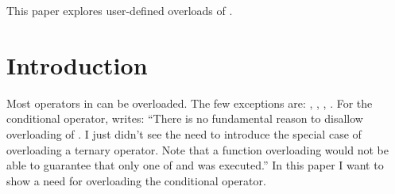 \newcommand\wgTitle{Making operator?: overloadable}
\newcommand\wgName{Matthias Kretz <m.kretz@gsi.de>}
\newcommand\wgDocumentNumber{D0917R4}
\newcommand\wgGroup{EWG-I}
\newcommand\wgTarget{\CC{}23}

\usepackage{mymacros}
\usepackage{wg21}
\usepackage{changelog}
\usepackage{underscore}



\newcommand\simd[1][]{\type{simd#1}\xspace}
\newcommand\simdT{\type{simd<T>}\xspace}
\newcommand\valuetype{\type{value\_type}\xspace}
\newcommand\referencetype{\type{reference}\xspace}
\newcommand\whereexpression{\type{where\_expression}\xspace}
\newcommand\simdcast{\code{simd\_cast}\xspace}
\newcommand\mask[1][]{\type{simd\_mask#1}\xspace}
\newcommand\maskT{\type{simd\_mask<T>}\xspace}
\newcommand\fixedsizeN{\type{simd\_abi::fixed\_size<N>}\xspace}
\newcommand\fixedsizescoped{\type{simd\_abi::fixed\_size}\xspace}
\newcommand\fixedsize{\type{fixed\_size}\xspace}
\newcommand\simdEP{\code{execution::}\type{simd}\xspace}
\newcommand\seqEP{\code{execution::}\type{seq}\xspace}

\newenvironment{tonytable}[1]{
\renewcommand\tablename{Tony Table}
\begin{table}[h]
\caption{#1}
\begin{tabular}{p{.45\textwidth}|p{.45\textwidth}}
before&after\\
\hline
}{
\end{tabular}
\end{table}
\renewcommand\tablename{Table}
}


\begin{wgTitlepage}
  This paper explores user-defined overloads of .
\end{wgTitlepage}

\pagestyle{scrheadings}
\section{Introduction}
Most operators in \CC{} can be overloaded.
The few exceptions are: , \code{::}, , .
For the conditional operator, \textcite{StrFaq} writes:
“There is no fundamental reason to disallow overloading of .
I just didn't see the need to introduce the special case of overloading a ternary operator.
Note that a function overloading  would not be able to guarantee that only one of  and  was executed.”
In this paper I want to show a need for overloading the conditional operator.

